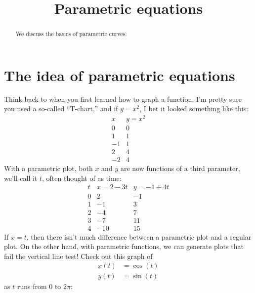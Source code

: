 \documentclass{ximera}
\title[Dig-In:]{Parametric equations}
\begin{document}
\begin{abstract}
  We discuss the basics of parametric curves.
\end{abstract}        
\maketitle

\section{The idea of parametric equations}

Think back to when you first learned how to graph a function. I'm
pretty sure you used a so-called ``T-chart,'' and if $y = x^2$, I bet it
looked something like this:
\[
\begin{array}{c|c}
  x & y = x^2\\\hline
  0 & 0 \\
  1 & 1\\
  -1 & 1\\
  2 & 4\\
  -2 & 4
\end{array}
\]
With a parametric plot, both $x$ and $y$ are now functions of a third
parameter, we'll call it $t$, often thought of as time:
\[
\begin{array}{c|c|c}
  t  & x = 2-3t & y = -1+4t\\\hline
  0  & 2  & -1 \\
  1  & -1 & 3 \\
  2  & -4 & 7 \\
  3  & -7 & 11\\
  4  & -10& 15
\end{array}
\]
If $x=t$, then there isn't much difference between a parametric plot
and a regular plot.  On the other hand, with parametric functions, we
can generate plots that fail the vertical line test! Check out this
graph of
\begin{align*}
x(t) &= \cos(t)\\
y(t) &= \sin(t)
\end{align*}
as $t$ runs from $0$ to $2\pi$:
\begin{image}
\end{image}
\end{document}
